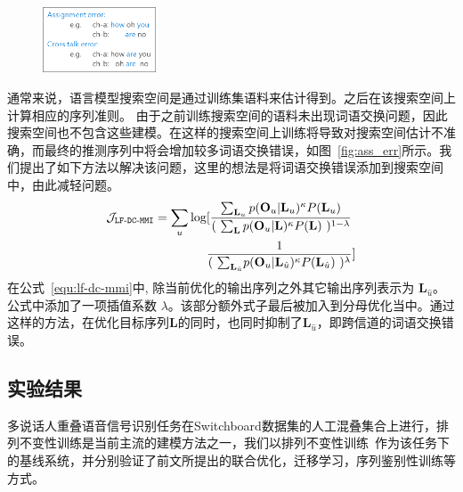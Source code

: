 \begin{figure}[!htp]
  \centering
    \captionstyle{\centering}
    \includegraphics[width=0.3\textwidth]{figure/ass_error.png}
\end{figure}


通常来说，语言模型搜索空间是通过训练集语料来估计得到。之后在该搜索空间上计算相应的序列准则。 
由于之前训练搜索空间的语料未出现词语交换问题，因此搜索空间也不包含这些建模。在这样的搜索空间上训练将导致对搜索空间估计不准确，而最终的推测序列中将会增加较多词语交换错误，如图~\ref{fig:ass_err}所示。我们提出了如下方法以解决该问题，这里的想法是将词语交换错误添加到搜索空间中，由此减轻问题。
\begin{equation}
\label{equ:lf-dc-mmi}
\begin{split}
\mathcal{J}_{\tt{LF\text{-}DC\text{-}MMI}}
=\sum_{u} \log  [ \frac {\sum_{\mathbf{L}_u} p(\mathbf{O}_u|\mathbf{L}_u)^{\kappa}P(\mathbf{L}_u)}{(\ \sum_{\mathbf{L}} p(\mathbf{O}_u|\mathbf{L})^{\kappa}P(\mathbf{L})\ )^{1-\lambda} } 
\  \\ 
\frac{1} {(\ {\sum_{\mathbf{L}_{\hat{u}}}} p(\mathbf{O}_u|{\mathbf{L}_{\hat{u}}})^{\kappa}P({\mathbf{L}_{\hat{u}}})\ )^\lambda}
 ]
\end{split}
\end{equation}
在公式~\ref{equ:lf-dc-mmi}中, 除当前优化的输出序列之外其它输出序列表示为 $\mathbf{L}_{\hat{u}}$。公式中添加了一项插值系数 $\lambda$。该部分额外式子最后被加入到分母优化当中。通过这样的方法，在优化目标序列$\mathbf{L}$的同时，也同时抑制了$\mathbf{L}_{\hat{u}}$，即跨信道的词语交换错误。


\subsection{实验结果} %
\label{Sec:exp-pit}

多说话人重叠语音信号识别任务在Switchboard数据集的人工混叠集合上进行，排列不变性训练是当前主流的建模方法之一，我们以排列不变性训练~\cite{yu2017recognizing}作为该任务下的基线系统，并分别验证了前文所提出的联合优化，迁移学习，序列鉴别性训练等方式。

